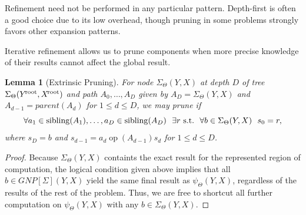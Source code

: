 \documentclass{article}
\newtheorem{lemma}{Lemma}
\newcommand{\killspace}{\vspace{-0.08in}}
\newcommand{\GNP}[1][\psi]{{#1}_{\Theta}}
\DeclareMathOperator{\sibling}{sibling}
\DeclareMathOperator{\op}{op}
\newcommand{\st}{{\rm~s.t.~}}
\newcommand{\kdroot}[1]{#1^{\!\text{\rm root}}}
\begin{document}
Refinement need not be performed in any particular pattern.
Depth-first is often a good choice due to its low overhead, though
pruning in some problems strongly favors other expansion patterns.


Iterative refinement allows us to prune components when more precise
knowledge of their results cannot affect the global result.
\begin{lemma}[Extrinsic Pruning]
  For node $\GNP[\Sigma](Y,X)$ at depth $D$ of tree
  $\GNP[\Sigma](\kdroot{Y},\kdroot{X})$ and path $A_0,\ldots,A_D$ given by
  $A_D = \GNP[\Sigma](Y,X)$ and $A_{d-1} = parent(A_{d})$ for $1 \leq
  d \leq D$, we may prune if
  \[
  \forall a_1 \in \sibling(A_1),\ldots,a_D \in \sibling(A_D)~~ \exists r \st~ \forall b \in \GNP[\Sigma](Y,X)~~ s_0 = r,
  \]
  where $s_D = b$ and $s_{d-1} = a_d \mathbin{\op(A_{d-1})} s_d$ for $1 \leq d
    \leq D$.
\end{lemma}
\killspace
\begin{proof}
  Because $\GNP[\Sigma](Y,X)$ containts the exact result for the
  represented region of computation, the logical condition given above
  implies that all $b \in GNP[\Sigma](Y,X)$ yield the same final
  result as $\GNP(Y,X)$, regardless of the results of the rest of the
  problem.  Thus, we are free to shortcut all further computation on
  $\GNP(Y,X)$ with any $b \in \GNP[\Sigma](Y,X)$.
\end{proof}
\end{document}
